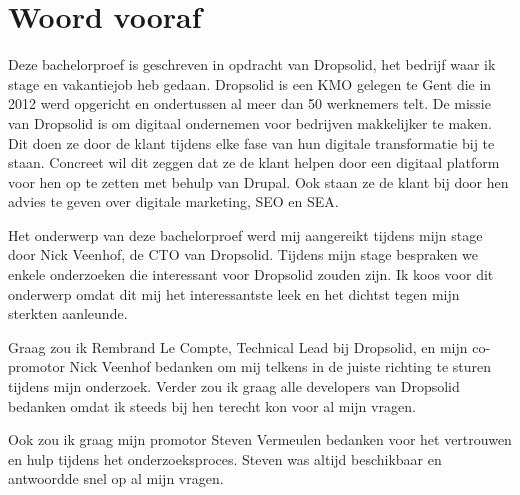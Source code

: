 
\chapter*{Woord vooraf}
\label{ch:voorwoord}


Deze bachelorproef is geschreven in opdracht van Dropsolid, het bedrijf waar ik stage en vakantiejob heb gedaan. Dropsolid is een KMO gelegen te Gent die in 2012 werd opgericht en ondertussen al meer dan 50 werknemers telt. De missie van Dropsolid is om digitaal ondernemen voor bedrijven makkelijker te maken. Dit doen ze door de klant tijdens elke fase van hun digitale transformatie bij te staan. Concreet wil dit zeggen dat ze de klant helpen door een digitaal platform voor hen op te zetten met behulp van Drupal. Ook staan ze de klant bij door hen advies te geven over digitale marketing, \gls{SEO} en \gls{SEA}.

Het onderwerp van deze bachelorproef werd mij aangereikt tijdens mijn stage door Nick Veenhof, de CTO van Dropsolid. Tijdens mijn stage bespraken we enkele onderzoeken die interessant voor Dropsolid zouden zijn. Ik koos voor dit onderwerp omdat dit mij het interessantste leek en het dichtst tegen mijn sterkten aanleunde.

Graag zou ik Rembrand Le Compte, Technical Lead bij Dropsolid, en mijn co-promotor Nick Veenhof bedanken om mij telkens in de juiste richting te sturen tijdens mijn onderzoek. Verder zou ik graag alle developers van Dropsolid bedanken omdat ik steeds bij hen terecht kon voor al mijn vragen.

Ook zou ik graag mijn promotor Steven Vermeulen bedanken voor het vertrouwen en hulp tijdens het onderzoeksproces. Steven was altijd beschikbaar en antwoordde snel op al mijn vragen.

